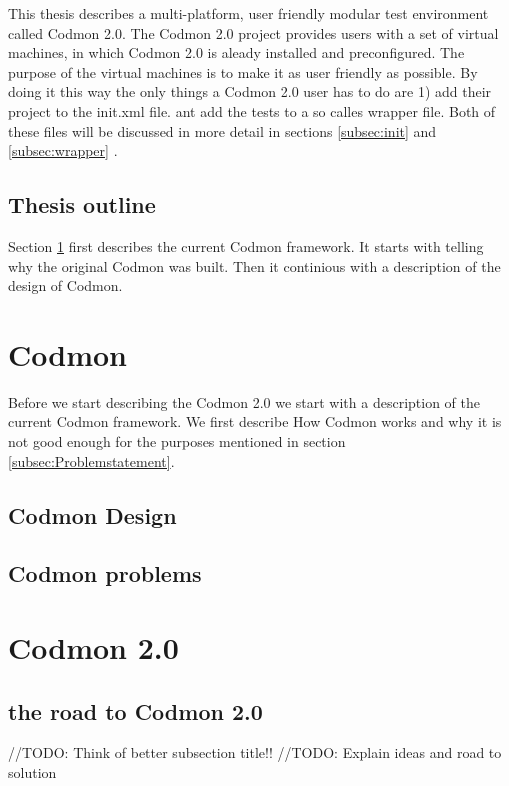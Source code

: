 \documentclass[a4paper,10pt]{scrartcl}
\newcommand{\project}{Codmon 2.0}
\begin{document}
\noindent This thesis describes a multi-platform, user friendly modular test environment called \project{}. The \project{} project provides users with a set of virtual machines,
in which \project{} is aleady installed and preconfigured. The purpose of the virtual machines is to make it as user friendly as possible. By doing it this way the only things
a \project{} user has to do are 1) add their project  to the init.xml file. ant add the tests to a so calles wrapper file. Both of these files will be discussed in more detail in 
sections \ref{subsec:init} and \ref{subsec:wrapper} .


\subsection{Thesis outline}
\label{subsec:Thesisoutline}
Section \ref{sec:codmon} first describes the current Codmon framework. It starts with telling why the original Codmon was built. Then it continious with a description of the design of Codmon.

\newpage

\section{Codmon}
\label{sec:codmon}
Before we start describing the \project{} we start with a description of the current Codmon framework. We first describe How Codmon works and why it is not good enough for the purposes mentioned
in section \ref{subsec:Problemstatement}.

\subsection{Codmon Design}
\label{subsec:CodmonDesign}
\subsection{Codmon problems}
\label{subsec:CodmonProblems}

\newpage
\section{\project{}}
\label{sec:Codmon2.0}

\subsection{the road to \project{}}
//TODO: Think of better subsection title!!
//TODO: Explain ideas and road to solution
\end{document}
